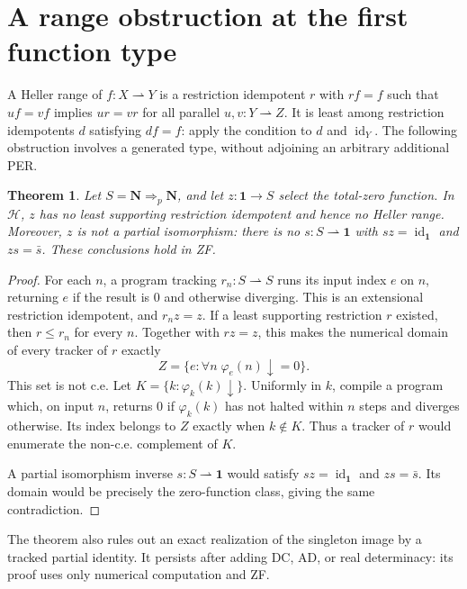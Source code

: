 \documentclass[11pt]{article}
\newtheorem{theorem}{Theorem}[section]
\theoremstyle{definition}
\newcommand{\Hcat}{\mathcal H}
\newcommand{\pArr}{\mathbin{\Rightarrow_{\!p}}}
\newcommand{\id}{\operatorname{id}}
\begin{document}
\section{A range obstruction at the first function type}\label{sec:range}

A Heller range of $f:X\rightharpoonup Y$ is a restriction idempotent
$r$ with $rf=f$ such that $uf=vf$ implies $ur=vr$ for all
parallel $u,v:Y\rightharpoonup Z$. It is least among restriction
idempotents $d$ satisfying $df=f$: apply the condition to $d$ and
$\id_Y$. The following obstruction involves a generated type,
without adjoining an arbitrary additional PER.

\begin{theorem}\label{thm:no-range}
Let $S=\mathbf N\pArr\mathbf N$, and let
$z:\mathbf1\to S$ select the total-zero function. In $\Hcat$,
$z$ has no least supporting restriction idempotent and hence no
Heller range. Moreover, $z$ is not a partial isomorphism: there is
no $s:S\rightharpoonup\mathbf1$ with $sz=\id_{\mathbf1}$ and
$zs=\bar s$. These conclusions hold in ZF.
\end{theorem}
\begin{proof}
For each $n$, a program tracking $r_n:S\rightharpoonup S$
runs its input index $e$ on $n$, returning $e$ if the result is
$0$ and otherwise diverging. This is an extensional restriction
idempotent, and $r_nz=z$. If a least supporting restriction $r$
existed, then $r\leq r_n$ for every $n$. Together with $rz=z$,
this makes the numerical domain of every tracker of $r$ exactly
\[
 Z=\{e:\forall n\;\varphi_e(n)\downarrow=0\}.
\]
This set is not c.e. Let $K=\{k:\varphi_k(k)\downarrow\}$.
Uniformly in $k$, compile a program which, on input $n$, returns
$0$ if $\varphi_k(k)$ has not halted within $n$ steps and diverges
otherwise. Its index belongs to $Z$ exactly when $k\notin K$.
Thus a tracker of $r$ would enumerate the non-c.e. complement of $K$.

A partial isomorphism inverse $s:S\rightharpoonup\mathbf1$ would satisfy
$sz=\id_{\mathbf1}$ and $zs=\bar s$. Its domain would be precisely
the zero-function class, giving the same contradiction.
\end{proof}

The theorem also rules out an exact realization of the singleton
image by a tracked partial identity. It persists after adding DC,
AD, or real determinacy: its proof uses only numerical computation
and ZF.
\end{document}
